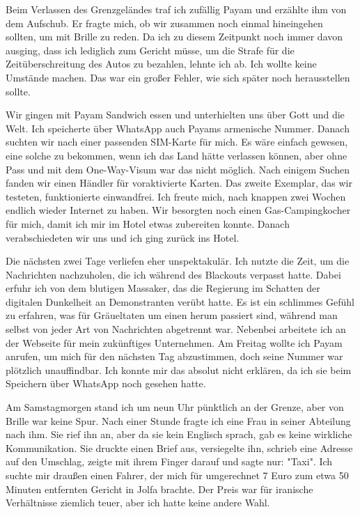 Beim Verlassen des Grenzgeländes traf ich zufällig Payam und erzählte ihm von dem Aufschub. Er fragte mich, ob wir zusammen noch einmal hineingehen sollten, um mit Brille zu reden. Da ich zu diesem Zeitpunkt noch immer davon ausging, dass ich lediglich zum Gericht müsse, um die Strafe für die Zeitüberschreitung des Autos zu bezahlen, lehnte ich ab. Ich wollte keine Umstände machen. Das war ein großer Fehler, wie sich später noch herausstellen sollte.

Wir gingen mit Payam Sandwich essen und unterhielten uns über Gott und die Welt. Ich speicherte über WhatsApp auch Payams armenische Nummer. Danach suchten wir nach einer passenden SIM-Karte für mich. Es wäre einfach gewesen, eine solche zu bekommen, wenn ich das Land hätte verlassen können, aber ohne Pass und mit dem One-Way-Visum war das nicht möglich. Nach einigem Suchen fanden wir einen Händler für voraktivierte Karten. Das zweite Exemplar, das wir testeten, funktionierte einwandfrei. Ich freute mich, nach knappen zwei Wochen endlich wieder Internet zu haben. Wir besorgten noch einen Gas-Campingkocher für mich, damit ich mir im Hotel etwas zubereiten konnte. Danach verabschiedeten wir uns und ich ging zurück ins Hotel.

Die nächsten zwei Tage verliefen eher unspektakulär. Ich nutzte die Zeit, um die Nachrichten nachzuholen, die ich während des Blackouts verpasst hatte. Dabei erfuhr ich von dem blutigen Massaker, das die Regierung im Schatten der digitalen Dunkelheit an Demonstranten verübt hatte. Es ist ein schlimmes Gefühl zu erfahren, was für Gräueltaten um einen herum passiert sind, während man selbst von jeder Art von Nachrichten abgetrennt war. Nebenbei arbeitete ich an der Webseite für mein zukünftiges Unternehmen. Am Freitag wollte ich Payam anrufen, um mich für den nächsten Tag abzustimmen, doch seine Nummer war plötzlich unauffindbar. Ich konnte mir das absolut nicht erklären, da ich sie beim Speichern über WhatsApp noch gesehen hatte.

Am Samstagmorgen stand ich um neun Uhr pünktlich an der Grenze, aber von Brille war keine Spur. Nach einer Stunde fragte ich eine Frau in seiner Abteilung nach ihm. Sie rief ihn an, aber da sie kein Englisch sprach, gab es keine wirkliche Kommunikation. Sie druckte einen Brief aus, versiegelte ihn, schrieb eine Adresse auf den Umschlag, zeigte mit ihrem Finger darauf und sagte nur: "Taxi". Ich suchte mir draußen einen Fahrer, der mich für umgerechnet 7 Euro zum etwa 50 Minuten entfernten Gericht in Jolfa brachte. Der Preis war für iranische Verhältnisse ziemlich teuer, aber ich hatte keine andere Wahl.

